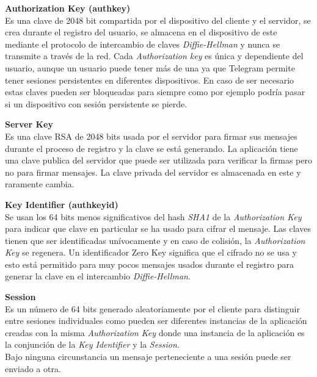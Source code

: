 \begin{description}
	\item \textbf{Authorization Key (auth\textunderscore key)}\\
	Es una clave de 2048 bit compartida por el dispositivo del cliente y el servidor, se crea durante el registro del usuario, se almacena en el dispositivo de este mediante el protocolo de intercambio de claves \emph{Diffie-Hellman} y nunca se transmite a través de la red. Cada \emph{Authorization key} es única y dependiente del usuario, aunque un usuario puede tener más de una ya que Telegram permite tener sesiones persistentes en diferentes dispositivos. En caso de ser necesario estas claves pueden ser bloqueadas para siempre como por ejemplo podría pasar si un dispositivo con sesión persistente se pierde.

	\item \textbf{Server Key}\\
	Es una clave RSA de 2048 bits usada por el servidor para firmar sus mensajes durante el proceso de registro y la clave se está generando. La aplicación tiene una clave publica del servidor que puede ser utilizada para verificar la firmas pero no para firmar mensajes. La clave privada del servidor es almacenada en este y raramente cambia.

	\item \textbf{Key Identifier (auth\textunderscore key\textunderscore id)}\\
	Se usan los 64 bits menos significativos del hash \emph{SHA1} de la \emph{Authorization Key} para indicar que clave en particular se ha usado para cifrar el mensaje. Las claves tienen que ser identificadas unívocamente y en caso de colisión, la \emph{Authorization Key} se regenera. Un identificador Zero Key significa que el cifrado no se usa y esto está permitido para muy pocos mensajes usados durante el registro para generar la clave en el intercambio \emph{Diffie-Hellman}.
	
	\item \textbf{Session}\\
	Es un número de 64 bits generado aleatoriamente por el cliente para distinguir entre sesiones individuales como pueden ser diferentes instancias de la aplicación creadas con la misma \emph{Authorization Key} donde una instancia de la aplicación es la conjunción de la \emph{Key Identifier} y la \emph{Session}.\\
	Bajo ninguna circunstancia un mensaje perteneciente a una sesión puede ser enviado a otra.


\end{description}
